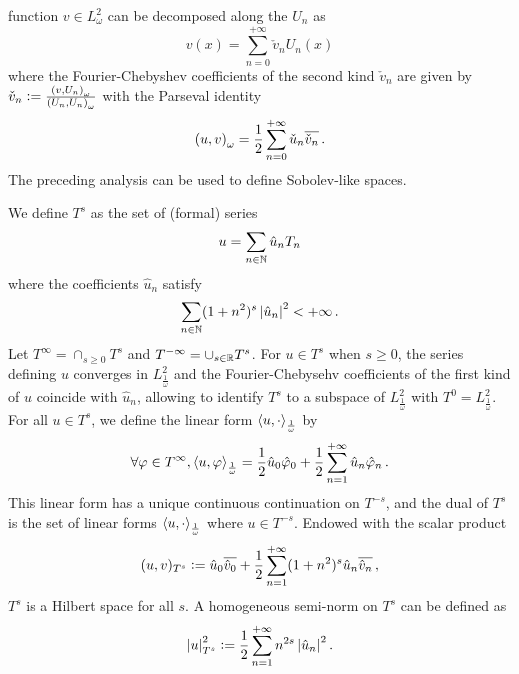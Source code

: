 \documentclass[a4paper]{article}
\begin{document}
function $v\in L^2_{\omega}$ can be decomposed along the $U_n$ as
\[ v(x) = \sum_{n=0}^{+\infty} \check{v}_n U_n(x)\]
where the Fourier-Chebyshev coefficients of the second kind $\check{v}_n$ are given by $ \check{v}_n \mathrel{\mathop:}= 
\frac{\left( v,U_n\right)_\omega}{\left( U_n,U_n\right)_\omega}$ with the Parseval identity
\[ \left( u,v\right)_\omega =  \frac{1}{2} \sum_{n=0}^{+\infty}\check{u}_n \overline{\check{v}_n} \,.\]
The preceding analysis can be used to define Sobolev-like spaces. 
\begin{Def}
	We define $T^s$ as the set of (formal) series
	\[u = \sum_{n \in \mathbb{N}} \hat{u}_n T_n\]
	where the coefficients $\hat{u}_n$ satisfy
	\[\sum_{n \in \mathbb{N}} (1 + n^2)^s \left\lvert \hat{u}_n \right\rvert^2 < + \infty\,.\]
	Let $T^{\infty} = \displaystyle\cap_{s \geq 0} T^s$ and $T^{-\infty} = \cup_{s \in \mathbb{R}} T^s$. For $u\in T^s$ when $s \geq 0$, the series defining $u$ converges in $L^2_\frac{1}{\omega}$ and the Fourier-Chebysehv coefficients of the first kind of $u$ coincide with $\hat{u}_n$, allowing to identify $T^s$ to a subspace of $L^2_\frac{1}{\omega}$ with $T^0 = L^2_\frac{1}{\omega}$. For all $u \in T^{s}$, we define the linear form $\left\langle u,\cdot\right\rangle_\frac{1}{\omega}$ by
	\begin{equation}
	\label{dualiteTs}
		\forall \varphi \in T^\infty, \left\langle u,\varphi\right\rangle_\frac{1}{\omega} = \frac{1}{2} \hat{u}_0 \hat \varphi_{0} + \frac{1}{2}\sum_{n = 1}^{+ \infty} \hat{u}_n \hat{\varphi}_n\,.
	\end{equation}
	This linear form has a unique continuous continuation on $T^{-s}$, and the dual of $T^s$ is the set of linear forms $\left\langle u,\cdot\right\rangle_\frac{1}{\omega}$ where $u \in T^{-s}$.  
	Endowed with the scalar product
	\[(u,v)_{T^s} \mathrel{\mathop:}= \hat{u}_0 \overline{\hat{v}_0} + \frac{1}{2}\sum_{n=1}^{+\infty}(1 + n^{2})^s\hat{u}_n \overline{\hat{v}_n}\,,\]
	$T^s$ is a Hilbert space for all $s$. A homogeneous semi-norm on $T^s$ can be defined as
	\[\left\lvert u \right\rvert_{T^s}^2 \mathrel{\mathop:}= \frac{1}{2}\sum_{n = 1}^{+ \infty}n^{2s} \left\lvert \hat{u}_n \right\rvert^2.\] 
\end{Def}
\end{document}
